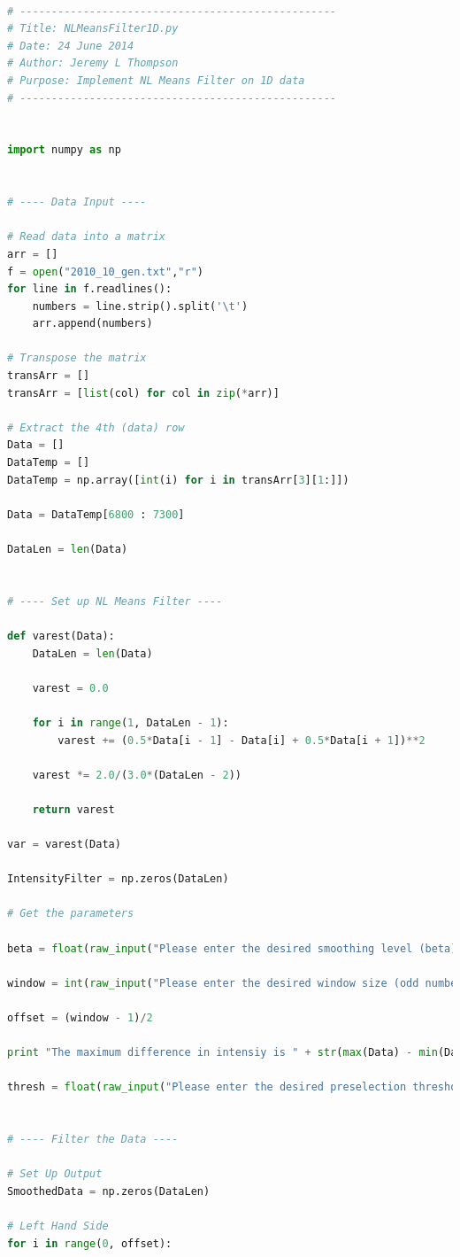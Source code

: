 \documentclass[11pt]{article}
\theoremstyle{definition}
\begin{document}
\begin{lstlisting}[language = Python]

# --------------------------------------------------
# Title: NLMeansFilter1D.py
# Date: 24 June 2014
# Author: Jeremy L Thompson
# Purpose: Implement NL Means Filter on 1D data
# --------------------------------------------------


import numpy as np


# ---- Data Input ----

# Read data into a matrix
arr = []
f = open("2010_10_gen.txt","r")
for line in f.readlines():
    numbers = line.strip().split('\t')
    arr.append(numbers)

# Transpose the matrix
transArr = []
transArr = [list(col) for col in zip(*arr)]

# Extract the 4th (data) row
Data = []
DataTemp = []
DataTemp = np.array([int(i) for i in transArr[3][1:]])

Data = DataTemp[6800 : 7300]

DataLen = len(Data)


# ---- Set up NL Means Filter ----

def varest(Data):
    DataLen = len(Data)

    varest = 0.0

    for i in range(1, DataLen - 1):
        varest += (0.5*Data[i - 1] - Data[i] + 0.5*Data[i + 1])**2

    varest *= 2.0/(3.0*(DataLen - 2))

    return varest

var = varest(Data)

IntensityFilter = np.zeros(DataLen)

# Get the parameters

beta = float(raw_input("Please enter the desired smoothing level (beta): "))

window = int(raw_input("Please enter the desired window size (odd number): "))

offset = (window - 1)/2

print "The maximum difference in intensiy is " + str(max(Data) - min(Data))

thresh = float(raw_input("Please enter the desired preselection threshold: "))


# ---- Filter the Data ----

# Set Up Output
SmoothedData = np.zeros(DataLen)

# Left Hand Side
for i in range(0, offset):


\end{lstlisting}
\end{document}

